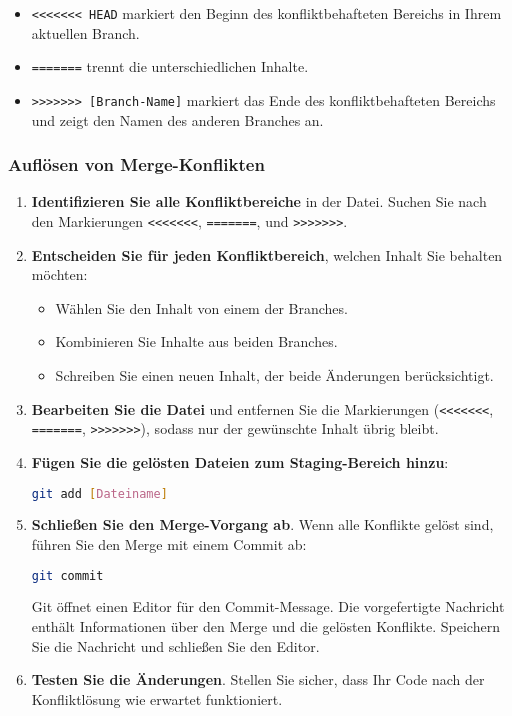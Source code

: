 \documentclass{vorlage-design-main}
\begin{document}
\begin{itemize}

\item
  \verb|<<<<<<< HEAD| markiert den Beginn des
  konfliktbehafteten Bereichs in Ihrem aktuellen Branch.
\item
  \verb|=======| trennt die unterschiedlichen
  Inhalte.
\item
  \verb|>>>>>>> [Branch-Name]| markiert das Ende des
  konfliktbehafteten Bereichs und zeigt den Namen des anderen Branches
  an.
\end{itemize}

\hypertarget{aufluxf6sen-von-merge-konflikten}{%
\subsubsection{Auflösen von
Merge-Konflikten}\label{aufloesen-von-merge-konflikten}}

\begin{enumerate}
\def\labelenumi{\arabic{enumi}.}
\item
  \textbf{Identifizieren Sie alle Konfliktbereiche} in der Datei. Suchen
  Sie nach den Markierungen \verb|<<<<<<<|,
  \verb|=======|, und
  \verb|>>>>>>>|.
\item
  \textbf{Entscheiden Sie für jeden Konfliktbereich}, welchen Inhalt Sie
  behalten möchten:

  \begin{itemize}
  
  \item
    Wählen Sie den Inhalt von einem der Branches.
  \item
    Kombinieren Sie Inhalte aus beiden Branches.
  \item
    Schreiben Sie einen neuen Inhalt, der beide Änderungen
    berücksichtigt.
  \end{itemize}
\item
  \textbf{Bearbeiten Sie die Datei} und entfernen Sie die Markierungen
  (\verb|<<<<<<<|, \verb|=======|,
  \verb|>>>>>>>|), sodass nur der gewünschte Inhalt
  übrig bleibt.
\item
  \textbf{Fügen Sie die gelösten Dateien zum Staging-Bereich hinzu}:

\begin{lstlisting}[language=bash]
git add [Dateiname]
\end{lstlisting}
\item
  \textbf{Schließen Sie den Merge-Vorgang ab}. Wenn alle Konflikte
  gelöst sind, führen Sie den Merge mit einem Commit ab:

\begin{lstlisting}[language=bash]
git commit
\end{lstlisting}

  Git öffnet einen Editor für den Commit-Message. Die vorgefertigte
  Nachricht enthält Informationen über den Merge und die gelösten
  Konflikte. Speichern Sie die Nachricht und schließen Sie den Editor.
\item
  \textbf{Testen Sie die Änderungen}. Stellen Sie sicher, dass Ihr Code
  nach der Konfliktlösung wie erwartet funktioniert.
\end{enumerate}
\end{document}
